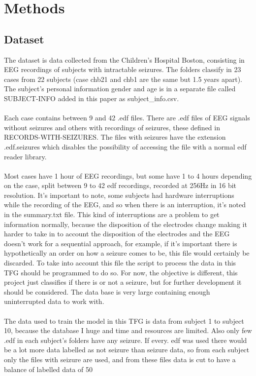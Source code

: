 \section{Methods}
\subsection{Dataset}
The dataset is data collected from the Children’s Hospital Boston, consisting in EEG recordings of subjects with intractable seizures. The folders classify in 23 cases from 22 subjects (case chb21 and chb1 are the same but 1.5 years apart). The subject’s personal information gender and age is in a separate file called SUBJECT-INFO added in this paper as subject\_info.csv.
\\\\
Each case contains between 9 and 42 .edf files. There are .edf files of EEG signals without seizures and others with recordings of seizures, these defined in RECORDS-WITH-SEIZURES. The files with seizures have the extension .edf.seizures which disables the possibility of accessing the file with a normal edf reader library.
\\\\
Most cases have 1 hour of EEG recordings, but some have 1 to 4 hours depending on the case, split between 9 to 42 edf recordings, recorded at 256Hz in 16 bit resolution. It’s important to note, some subjects had hardware interruptions while the recording of the EEG, and so when there is an interruption, it’s noted in the summary.txt file. This kind of interruptions are a problem to get information normally, because the disposition of the electrodes change making it harder to take in to account the disposition of the electrodes and the EEG doesn’t work for a sequential approach, for example, if it’s important there is hypothetically an order on how a seizure comes to be, this file would certainly be discarded. To take into account this file the script to process the data in this TFG should be programmed to do so. For now, the objective is different, this project just classifies if there is or not a seizure, but for further development it should be considered. The data base is very large containing enough uninterrupted data to work with.
\\\\
The data used to train the model in this TFG is data from subject 1 to subject 10, because the database I huge and time and resources are limited. Also only few .edf in each subject’s folders have any seizure. If every. edf was used there would be a lot more data labelled as not seizure than seizure data, so from each subject only the files with seizure are used, and from these files data is cut to have a balance of labelled data of 50%
